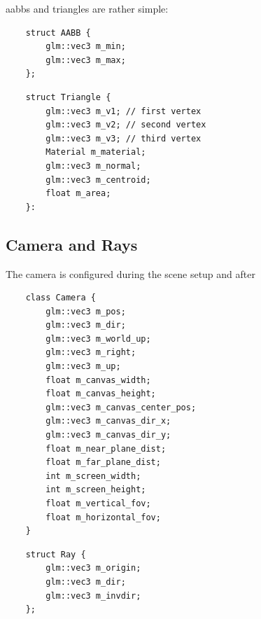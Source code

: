 \documentclass[
  twoside,
  11pt, a4paper,
  footinclude=true,
  headinclude=true,
  cleardoublepage=empty
]{scrreprt}
\begin{document}
\vspace{1cm}

\acp{aabb} and triangles are rather simple:

\begin{verbatim}
    struct AABB {
        glm::vec3 m_min;
        glm::vec3 m_max;
    };
\end{verbatim}

\begin{verbatim}
    struct Triangle {
        glm::vec3 m_v1; // first vertex
        glm::vec3 m_v2; // second vertex
        glm::vec3 m_v3; // third vertex
        Material m_material;
        glm::vec3 m_normal;
        glm::vec3 m_centroid;
        float m_area;
    }:
\end{verbatim}

\subsection{Camera and Rays}

The camera is configured during the scene setup and after

\begin{verbatim}
    class Camera {
        glm::vec3 m_pos;
        glm::vec3 m_dir;
        glm::vec3 m_world_up;
        glm::vec3 m_right;
        glm::vec3 m_up;
        float m_canvas_width;
        float m_canvas_height;
        glm::vec3 m_canvas_center_pos;
        glm::vec3 m_canvas_dir_x;
        glm::vec3 m_canvas_dir_y;
        float m_near_plane_dist;
        float m_far_plane_dist;
        int m_screen_width;
        int m_screen_height;
        float m_vertical_fov;
        float m_horizontal_fov;
    }
\end{verbatim}

\begin{verbatim}
    struct Ray {
        glm::vec3 m_origin;
        glm::vec3 m_dir;
        glm::vec3 m_invdir;
    };
\end{verbatim}
\end{document}
